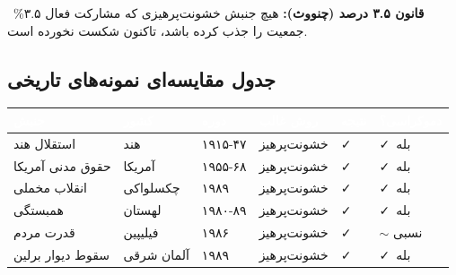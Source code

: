 \documentclass[a4paper,12pt]{article}
\begin{document}
\begin{notebox}[yellowPrimary]
\textcolor{yellowPrimary}{\faStar\ \textbf{قانون ۳.۵ درصد (چنووث):}} هیچ جنبش خشونت‌پرهیزی که مشارکت فعال ۳.۵\% جمعیت را جذب کرده باشد، تاکنون شکست نخورده است.
\end{notebox}



\subsection{جدول مقایسه‌ای نمونه‌های تاریخی}

{
\small
{}
\begin{longtable}{
  >{\raggedright\arraybackslash}p{3cm}
  >{\centering\arraybackslash}p{1.5cm}
  >{\centering\arraybackslash}p{2cm}
  >{\centering\arraybackslash}p{2.5cm}
  >{\centering\arraybackslash}p{1.5cm}
  >{\centering\arraybackslash}p{2cm}
}
\toprule
\rowcolor{midbg}
\textcolor{white}{\textbf{جنبش}} &
\textcolor{white}{\textbf{کشور}} &
\textcolor{white}{\textbf{دوره}} &
\textcolor{white}{\textbf{روش غالب}} &
\textcolor{white}{\textbf{نتیجه}} &
\textcolor{white}{\textbf{دموکراسی؟}} \\
\midrule
\endhead

استقلال هند & هند & ۱۹۱۵-۴۷ & \textcolor{greenPrimary}{خشونت‌پرهیز} & \textcolor{greenPrimary}{\faCheck} & \textcolor{greenPrimary}{\faCheck\ بله} \\

حقوق مدنی آمریکا & آمریکا & ۱۹۵۵-۶۸ & \textcolor{greenPrimary}{خشونت‌پرهیز} & \textcolor{greenPrimary}{\faCheck} & \textcolor{greenPrimary}{\faCheck\ بله} \\

انقلاب مخملی & چکسلواکی & ۱۹۸۹ & \textcolor{greenPrimary}{خشونت‌پرهیز} & \textcolor{greenPrimary}{\faCheck} & \textcolor{greenPrimary}{\faCheck\ بله} \\

همبستگی & لهستان & ۱۹۸۰-۸۹ & \textcolor{greenPrimary}{خشونت‌پرهیز} & \textcolor{greenPrimary}{\faCheck} & \textcolor{greenPrimary}{\faCheck\ بله} \\

قدرت مردم & فیلیپین & ۱۹۸۶ & \textcolor{greenPrimary}{خشونت‌پرهیز} & \textcolor{greenPrimary}{\faCheck} & \textcolor{yellowPrimary}{$\sim$ نسبی} \\

سقوط دیوار برلین & آلمان شرقی & ۱۹۸۹ & \textcolor{greenPrimary}{خشونت‌پرهیز} & \textcolor{greenPrimary}{\faCheck} & \textcolor{greenPrimary}{\faCheck\ بله} \\


\end{longtable}}
\end{document}
